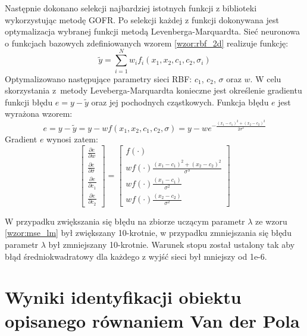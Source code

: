Następnie dokonano selekcji najbardziej istotnych funkcji z biblioteki wykorzystując metodę GOFR. Po selekcji każdej z funkcji dokonywana jest optymalizacja wybranej funkcji metodą Levenberga-Marquardta. Sieć neuronowa o funkcjach bazowych zdefiniowanych wzorem \ref{wzor:rbf_2d} realizuje funkcję:
\begin{equation}
	\tilde{y} = \sum_{i=1}^N w_i f_i(x_1,x_2,c_1,c_2,\sigma_i)
\end{equation}
Optymalizowano następujące parametry sieci RBF: $c_1$, $c_2$, $\sigma$ oraz $w$. W celu skorzystania z~metody Leveberga-Marquardta konieczne jest określenie gradientu funkcji błędu $e = y - \tilde{y}$ oraz jej pochodnych cząstkowych. Funkcja błędu $e$ jest wyrażona wzorem:
\begin{equation}
	e = y - \tilde{y} = y - w f(x_1,x_2,c_1,c_2,\sigma) = y - w e^{-\frac{(x_1-c_1)^2 + (x_2-c_2)^2}{2 \sigma^2}} 
\end{equation}
Gradient $e$ wynosi zatem:
\begin{equation}
\begin{bmatrix}
	\frac{\partial e}{\partial w} \\
	\frac{\partial e}{\partial \sigma} \\
	\frac{\partial e}{\partial c_1} \\
	\frac{\partial e}{\partial c_2}
\end{bmatrix} = 
\begin{bmatrix}
	f(\cdot) \\
	w f(\cdot) \frac{(x_1 - c_1)^2 + (x_2 - c_2)^2}{\sigma^3}\\
	w f(\cdot) \frac{(x_1 - c_1)}{\sigma^2}\\
	w f(\cdot) \frac{(x_2 - c_2)}{\sigma^2}	
\end{bmatrix}
\end{equation}

W przypadku zwiększania się błędu na zbiorze uczącym parametr $\lambda$ ze wzoru \ref{wzor:mse_lm} był zwiększany 10-krotnie, w przypadku zmniejszania się błędu parametr $\lambda$ był zmniejszany 10-krotnie. Warunek stopu został ustalony tak aby błąd średniokwadratowy dla każdego z wyjść sieci był mniejszy od 1e-6. 






\clearpage
\section{Wyniki identyfikacji obiektu opisanego równaniem Van der Pola}

